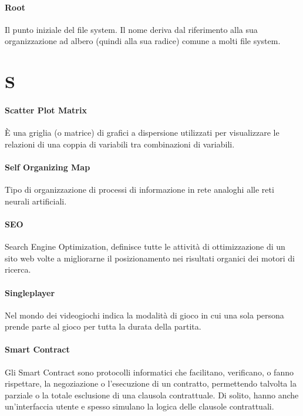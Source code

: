 \documentclass[]{article}
\begin{document}
	\paragraph*{Root}
	Il punto iniziale del file system. Il nome deriva dal riferimento alla sua organizzazione ad albero (quindi alla sua radice) comune a molti file system.
		
	\newpage
	
	\section*{S}
	
	\paragraph*{Scatter Plot Matrix}
	È una griglia (o matrice) di grafici a dispersione utilizzati per visualizzare le relazioni di una coppia di variabili tra combinazioni di variabili.
	
	\paragraph*{Self Organizing Map}
	Tipo di organizzazione di processi di informazione in rete analoghi alle reti neurali artificiali.
	
	\paragraph*{SEO}
	Search Engine Optimization, definisce tutte le attività di ottimizzazione di un sito web volte a migliorarne il posizionamento nei risultati organici dei motori di ricerca.
	
	\paragraph*{Singleplayer}
	Nel mondo dei videogiochi indica la modalità di gioco in cui una sola persona prende parte al gioco per tutta la durata della partita.
	
	\paragraph*{Smart Contract}
	Gli Smart Contract sono protocolli informatici che facilitano, verificano, o fanno rispettare, la negoziazione o l'esecuzione di un contratto, permettendo talvolta la parziale o la totale esclusione di una clausola contrattuale. Di solito, hanno anche un'interfaccia utente e spesso simulano la logica delle clausole contrattuali.
	
\end{document}
